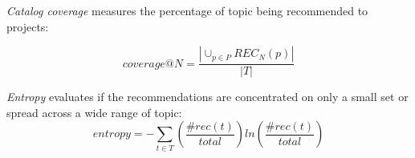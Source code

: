 \emph{Catalog coverage} measures the percentage of topic being recommended to projects:%

\begin{equation}\label{eqn:Coverage}
coverage@N = \frac{\left | \cup_{p\in P} REC_{N}(p) \right | }{\left | T \right |} 
\end{equation}	

\emph{Entropy} evaluates if the recommendations are concentrated on only a small set or spread across a wide range of topic:%
\begin{equation}\label{eqn:Entropy}
entropy = -\sum_{t \in T}\left ( \frac{\#rec(t)}{total} \right )ln \left ( \frac{\#rec(t)}{total} \right )
\end{equation}





